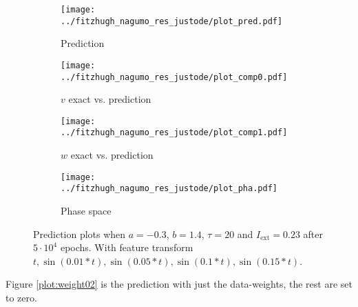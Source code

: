\documentclass[a4paper]{article}
\begin{document}
\begin{figure}[H]
	\centering 
	\begin{subfigure}[b]{0.47\textwidth}
		\centering
		\texttt{[image: ../fitzhugh\_nagumo\_res\_justode/plot\_pred.pdf]}
		\caption{Prediction}
		\label{fig:weight01a}
	\end{subfigure}
	\begin{subfigure}[b]{0.47\textwidth}
		\centering
		\texttt{[image: ../fitzhugh\_nagumo\_res\_justode/plot\_comp0.pdf]}
		\caption{$v$ exact vs. prediction}
		\label{fig:weight01b}
	\end{subfigure}
	\begin{subfigure}[b]{0.47\textwidth}
		\centering
		\texttt{[image: ../fitzhugh\_nagumo\_res\_justode/plot\_comp1.pdf]}
		\caption{$w$ exact vs. prediction}
		\label{fig:weight01c}
	\end{subfigure}
	\begin{subfigure}[b]{0.47\textwidth}
		\centering
		\texttt{[image: ../fitzhugh\_nagumo\_res\_justode/plot\_pha.pdf]}
		\caption{Phase space}
		\label{fig:weight01d}
	\end{subfigure}
	\caption{Prediction plots when $a=-0.3$, $b=1.4$, $\tau=20$ and $ I_{\text{ext}}=0.23$ after $5\cdot10^4$ epochs. With feature transform $t, \sin(0.01 * t), \sin(0.05 * t), \sin(0.1 * t), \sin(0.15 * t)$.}
	\label{plot:weight01}
\end{figure} 	

Figure \ref{plot:weight02} is the prediction with just the data-weights, the rest are set to zero.
\end{document}
